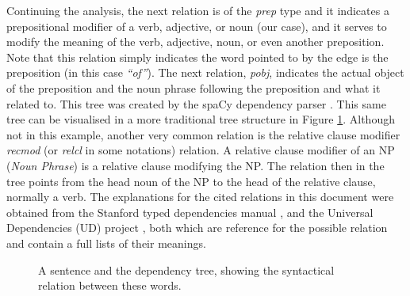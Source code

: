 \documentclass[11pt,a4paper,openright]{memoir}
\begin{document}
Continuing the analysis, the next relation is of the \emph{prep} type and it indicates a prepositional modifier of a verb, adjective, or noun (our case), and it serves to modify the meaning of the verb, adjective, noun, or even another preposition. Note that this relation simply indicates the word pointed to by the edge is the preposition (in this case \emph{\enquote{of}}). The next relation, \emph{pobj}, indicates the actual object of the preposition and the noun phrase following the preposition and what it related to. This tree was created by the spaCy dependency parser \cite{honnibal-johnson:2015:EMNLP, spacy}. This same tree can be visualised in a more traditional tree structure in Figure \ref{fig:sub_sentences_dependency_tree}. Although not in this example, another very common relation is the relative clause modifier \emph{recmod} (or \emph{relcl} in some notations) relation. A relative clause modifier of an NP (\emph{Noun Phrase}) is a relative clause modifying the NP. The relation then in the tree points from the head noun of the NP to the head of the relative clause, normally a verb. The explanations for the cited relations in this document were obtained from the Stanford typed dependencies manual \cite{Marneffe08stanfordtyped}, and the Universal Dependencies (UD) project \cite{universal-dependencies-11234/1-1699}, both which are reference for the possible relation and contain a full lists of their meanings.

\begin{figure}[!htbp]

\centering
{}

\caption[A sentence and the dependency tree, showing the syntactical relation between these words.]{A sentence and the dependency tree, showing the syntactical relation between these words.}
\label{fig:sub_sentences_dependency_tree}
\end{figure}
\end{document}
